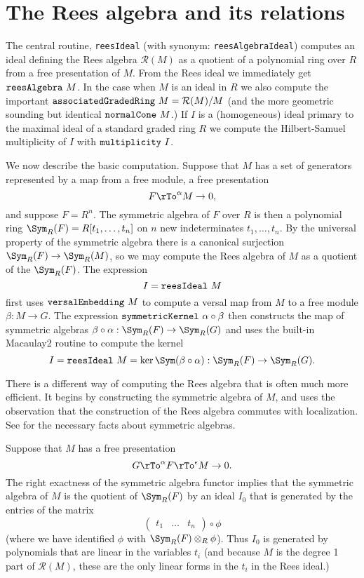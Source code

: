 \documentclass[twoside,12pt, leqno]{amsart}
\def\RR{{\mathcal R}}
\begin{document}
\section{The Rees algebra and its relations}

\noindent The central routine, {\tt reesIdeal} (with synonym: {\tt reesAlgebraIdeal}) computes an ideal
defining the Rees algebra $\RR(M)$ as a quotient of a polynomial ring over $R$ from a free presentation of $M$. From the Rees ideal we immediately get
${\tt reesAlgebra}\ M$. In the case when $M$ is an ideal in $R$ we also compute
the important ${\tt associatedGradedRing\ }M = \RR(M)/M$ (and the more geometric sounding but identical ${\tt normalCone\ }M$.)  
If $I$ is a (homogeneous) ideal primary to the
maximal ideal of a standard graded ring $R$ we compute the
Hilbert-Samuel multiplicity of $I$ with ${\tt multiplicity\ }I$.

We now describe the basic computation. Suppose that $M$ has 
a set of generators represented by a map from a free module,
a free presentation
$$
 F\rTo^\alpha M\to 0,
$$
and suppose  $F = R^n$. The symmetric algebra of $F$ over $R$ is then a polynomial ring
$\Sym_R(F) = R[t_1,\dots, t_n]$ on $n$ new indeterminates $t_1,\dots, t_n$. By the universal
property of the symmetric algebra there is a canonical surjection
$\Sym_R(F)\rightarrow \Sym_R(M)$, so we may compute the Rees algebra of $M$ as
a quotient of the  $\Sym_R(F)$. The expression
$$
I = {\tt reesIdeal}\ M
$$
first uses ${\tt versalEmbedding\ }M$ to compute a versal map from $M$ to a free module $\beta: M\to G$. The expression ${\tt symmetricKernel\ } \alpha\circ\beta$  then constructs the map of symmetric algebras $\beta\circ \alpha:\Sym_R(F)\to \Sym_R(G)$ and uses
 the built-in Macaulay2 routine to compute the kernel 
$$
I = {\tt reesIdeal\ }M = \ker \Sym(\beta\circ\alpha): \Sym_R(F) \to \Sym_R(G).
$$

There is a different way of computing the Rees algebra that is often much more efficient. It begins by constructing the symmetric algebra of $M$, and uses the observation that the construction of the Rees algebra commutes with localization. See \cite[Appendix 2]{E} for the necessary facts about symmetric algebras.

Suppose that $M$ has a free presentation
$$
G\rTo^\alpha F\rTo^\epsilon M\to 0.
$$
The right exactness of the symmetric algebra functor implies that the symmetric algebra of $M$ is the quotient of $\Sym_R(F)$ by an ideal $I_0$ that is
generated by the
entries of the matrix
$$
\begin{pmatrix}
 t_1&\dots&t_n
 \end{pmatrix}
 \circ \phi
$$
(where we have identified $\phi$ with $\Sym_R(F)\otimes_R\phi$).
Thus $I_0$ is generated by polynomials that are linear in the variables $t_i$ (and because
$M$ is the degree 1 part of $\RR(M)$, these are the only linear forms in the $t_i$ in the
Rees ideal.)
\end{document}
